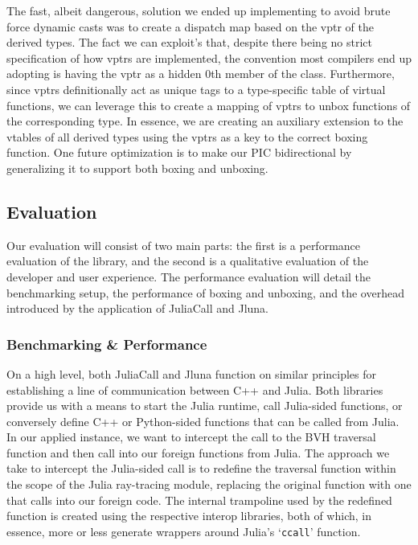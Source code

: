 \begin{listing}[ht!]
  
  \caption{Pseudocode snippet of the boxing process}
  \label{listing:box_usertype}
\end{listing}

The fast, albeit dangerous, solution we ended up implementing to avoid brute force dynamic casts was to create a dispatch map based on the vptr of the derived types. The fact we can exploit's that, despite there being no strict specification of how vptrs are implemented, the convention most compilers end up adopting is having the vptr as a hidden 0th member of the class. Furthermore, since vptrs definitionally act as unique tags to a type-specific table of virtual functions, we can leverage this to create a mapping of vptrs to unbox functions of the corresponding type. In essence, we are creating an auxiliary extension to the vtables of all derived types using the vptrs as a key to the correct boxing function. One future optimization is to make our PIC bidirectional by generalizing it to support both boxing and unboxing.

\subsection{Evaluation}

Our evaluation will consist of two main parts: the first is a performance evaluation of the library, and the second is a qualitative evaluation of the developer and user experience. The performance evaluation will detail the benchmarking setup, the performance of boxing and unboxing, and the overhead introduced by the application of JuliaCall and Jluna.  

\subsubsection{Benchmarking \& Performance}

On a high level, both JuliaCall and Jluna function on similar principles for establishing a line of communication between C++ and Julia. Both libraries provide us with a means to start the Julia runtime, call Julia-sided functions, or conversely define C++ or Python-sided functions that can be called from Julia. In our applied instance, we want to intercept the call to the BVH traversal function and then call into our foreign functions from Julia. The approach we take to intercept the Julia-sided call is to redefine the traversal function within the scope of the Julia ray-tracing module, replacing the original function with one that calls into our foreign code. The internal trampoline used by the redefined function is created using the respective interop libraries, both of which, in essence, more or less generate wrappers around Julia's `\texttt{ccall}' function. 

